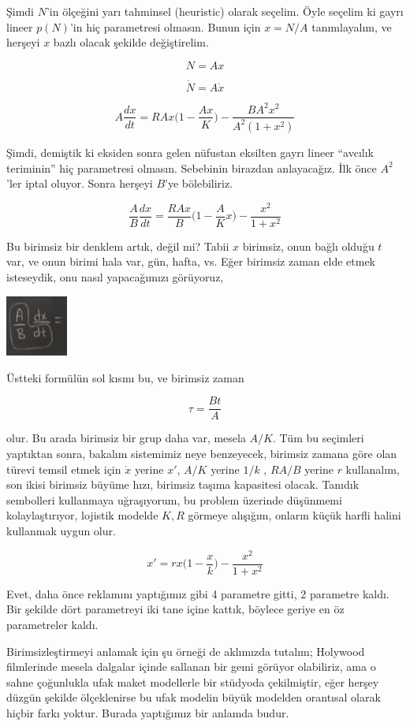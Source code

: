 \documentclass[12pt,fleqn]{article}\usepackage{../../common}
\begin{document}
Şimdi $N$'in ölçeğini yarı tahminsel (heuristic) olarak seçelim. Öyle seçelim ki
gayrı lineer $p(N)$'in hiç parametresi olmasın. Bunun için $x = N / A$
tanımlayalım, ve herşeyi $x$ bazlı olacak şekilde değiştirelim.

$$ N = Ax $$

$$ \dot{N} = A \dot{x}$$

$$
A \frac{dx}{dt} = R A x \big(1 - \frac{Ax}{K} \big) -
\frac{BA^2x^2}{A^2(1+x^2)}
$$

Şimdi, demiştik ki eksiden sonra gelen nüfustan eksilten gayrı lineer ``avcılık
teriminin'' hiç parametresi olmasın. Sebebinin birazdan anlayacağız. İlk önce
$A^2$'ler iptal oluyor. Sonra herşeyi $B$'ye bölebiliriz.

$$
\frac{A}{B}\frac{dx}{dt} = \frac{RAx}{B} \bigg( 1 - \frac{A}{K}x \bigg) -
\frac{x^2}{1+x^2}
$$

Bu birimsiz bir denklem artık, değil mi? Tabii $x$ birimsiz, onun bağlı olduğu
$t$ var, ve onun birimi hala var, gün, hafta, vs. Eğer birimsiz zaman elde etmek
isteseydik, onu nasıl yapacağımızı görüyoruz,

\includegraphics[height=2cm]{04_02.png}

Üstteki formülün sol kısmı bu, ve birimsiz zaman 

$$ \tau = \frac{Bt}{A} $$

olur. Bu arada birimsiz bir grup daha var, mesela $A/K$. Tüm bu seçimleri
yaptıktan sonra, bakalım sistemimiz neye benzeyecek, birimsiz zamana göre olan
türevi temsil etmek için $\dot{x}$ yerine $x'$, $A/K$ yerine $1/k$ , $RA/B$
yerine $r$ kullanalım, son ikisi birimsiz büyüme hızı, birimsiz taşıma
kapasitesi olacak. Tanıdık sembolleri kullanmaya uğraşıyorum, bu problem
üzerinde düşünmemi kolaylaştırıyor, lojistik modelde $K,R$ görmeye alışığım,
onların küçük harfli halini kullanmak uygun olur.

$$ x' = rx \bigg( 1 - \frac{x}{k}\bigg) - \frac{x^2}{1+x^2} $$

Evet, daha önce reklamını yaptığımız gibi 4 parametre gitti, 2 parametre
kaldı. Bir şekilde dört parametreyi iki tane içine kattık, böylece geriye en öz
parametreler kaldı. 

Birimsizleştirmeyi anlamak için şu örneği de aklımızda tutalım; Holywood
filmlerinde mesela dalgalar içinde sallanan bir gemi görüyor olabiliriz, ama o
sahne çoğunlukla ufak maket modellerle bir stüdyoda çekilmiştir, eğer herşey
düzgün şekilde ölçeklenirse bu ufak modelin büyük modelden orantısal olarak
hiçbir farkı yoktur. Burada yaptığımız bir anlamda budur.
\end{document}
